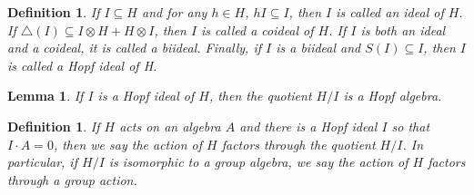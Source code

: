 \documentclass[12pt,a4paper]{article}
\newtheorem{lemma}[theorem]{Lemma}
\newtheorem{definition}[theorem]{Definition}
\newcommand\1{_{(1)}}
\newcommand\2{_{(2)}}
\begin{document}
\begin{definition}
    If $I\subseteq H$ and for any $h\in H$, $hI\subseteq I$, then $I$ is called an ideal of $H$.
    If $\triangle(I)\subseteq I\otimes H+H\otimes I$, then $I$ is called a coideal of $H$.
    If $I$ is both an ideal and a coideal, it is called a biideal.
    Finally, if $I$ is a biideal and $S(I)\subseteq I$, then $I$ is called a Hopf ideal of H.
\end{definition}

\begin{lemma}
    If $I$ is a Hopf ideal of $H$, then the quotient $H/I$ is a Hopf algebra.
\end{lemma}

\begin{definition}
    If $H$ acts on an algebra $A$ and there is a Hopf ideal $I$ so that $I\cdot A=0$, then we say the action of $H$ factors through the quotient $H/I$.
    In particular, if $H/I$ is isomorphic to a group algebra, we say the action of $H$ factors through a group action.
\end{definition}
\end{document}
